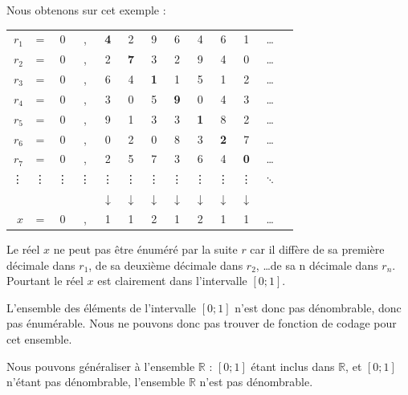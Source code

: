 Nous obtenons sur cet exemple :

\begin{tabular}{r c c c c c c c c c c c c}
$r_1$ & = &0&,&\textbf{4}&2&9&6&4&6&1 &\ldots\\
$r_2$ & = &0&,&2&\textbf{7}&3&2&9&4&0 &\ldots\\
$r_3$ & = &0&,&6&4&\textbf{1}&1&5&1&2 &\ldots\\
$r_4$ & = &0&,&3&0&5&\textbf{9}&0&4&3 &\ldots\\
$r_5$ & = &0&,&9&1&3&3&\textbf{1}&8&2 &\ldots\\
$r_6$ & = &0&,&0&2&0&8&3&\textbf{2}&7 &\ldots\\
$r_7$ & = &0&,&2&5&7&3&6&4&\textbf{0} &\ldots\\
\vdots & \vdots & \vdots & \vdots & \vdots & \vdots & \vdots & \vdots & \vdots & \vdots & \vdots & $\ddots$ \\
&&&&$\downarrow$ &$\downarrow$ &$\downarrow$ &$\downarrow$ &$\downarrow$ &$\downarrow$ &$\downarrow$ &\\
$x$ & = &0&,&1&1&2&1&2&1&1&\ldots\\
\end{tabular}

Le réel $x$ ne peut pas être énuméré par la suite $r$ car il diffère de sa première décimale dans $r_1$, de sa deuxième décimale dans $r_2$, \ldots de sa n décimale dans $r_n$. Pourtant le réel $x$ est clairement dans l'intervalle $[0;1]$.

L'ensemble des éléments de l'intervalle $[0;1]$ n'est donc pas dénombrable, donc pas énumérable. Nous ne pouvons donc pas trouver de fonction de codage pour cet ensemble.

Nous pouvons généraliser à l'ensemble $\mathbb{R}$ : $[0;1]$ étant inclus dans $\mathbb{R}$, et $[0;1]$ n'étant pas dénombrable, l'ensemble $\mathbb{R}$ n'est pas dénombrable.